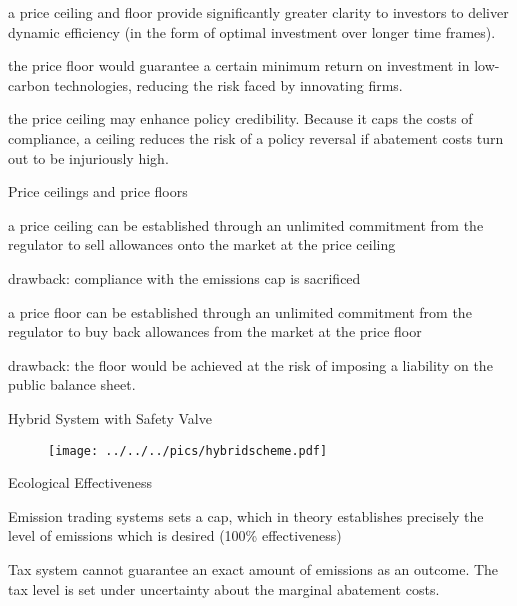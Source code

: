 	a price ceiling and floor provide significantly
greater clarity to investors to deliver dynamic efficiency (in the form of optimal investment
over longer time frames).


	the price floor would guarantee a certain minimum return on
investment in low-carbon technologies, reducing the risk faced by innovating firms.


	the price ceiling may enhance policy credibility. Because it caps the costs of
compliance, a ceiling reduces the risk of a policy reversal if abatement costs turn out to be
injuriously high.





{Price ceilings and price floors}






	a price ceiling can be established through an unlimited commitment from the regulator to sell allowances onto the market at the price ceiling


	drawback: compliance with the emissions cap is sacrificed


	a price floor can be established
through an unlimited commitment from the regulator to buy back
allowances from the market at the price floor


	drawback: the floor would be achieved at the risk of
imposing a liability on the public balance sheet.





{Hybrid System with Safety Valve}

\begin{center}
\begin{figure}[h!]
\centering
\texttt{[image: ../../../pics/hybridscheme.pdf]}
\end{figure}
\end{center}

{Ecological Effectiveness}






	Emission trading systems sets a cap, which in theory establishes precisely the level of emissions which is desired (100\% effectiveness)


	Tax system cannot guarantee an exact amount of emissions as an  outcome. The tax level is set under uncertainty about the marginal abatement costs.


